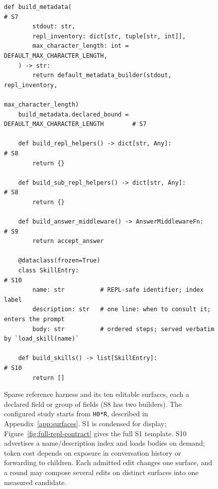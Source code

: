 \begin{figure}[t]
\begin{lstlisting}[style=harness, gobble=4]
    def build_metadata(                                                  # S7
        stdout: str,
        repl_inventory: dict[str, tuple[str, int]],
        max_character_length: int = DEFAULT_MAX_CHARACTER_LENGTH,
    ) -> str:
        return default_metadata_builder(stdout, repl_inventory,
                                        max_character_length)
    build_metadata.declared_bound = DEFAULT_MAX_CHARACTER_LENGTH        # S7
    
    def build_repl_helpers() -> dict[str, Any]:                          # S8
        return {}
    
    def build_sub_repl_helpers() -> dict[str, Any]:                      # S8
        return {}
    
    def build_answer_middleware() -> AnswerMiddlewareFn:                 # S9
        return accept_answer
    
    @dataclass(frozen=True)
    class SkillEntry:                                                    # S10
        name: str          # REPL-safe identifier; index label
        description: str   # one line: when to consult it; enters the prompt
        body: str          # ordered steps; served verbatim by `load_skill(name)`
    
    def build_skills() -> list[SkillEntry]:                              # S10
        return []
    \end{lstlisting}
    \caption{Sparse reference harness \hzero{} and its ten editable surfaces,
    each a declared field or group of fields (S8 has two builders). The configured
    study starts from \texttt{H0*R}, described in Appendix~\ref{app:surfaces}.
    S1 is condensed for display; Figure~\ref{fig:full-repl-contract} gives the
    full \hzero{} S1 template. S10 advertises a name/description index and loads
    bodies on demand; token cost depends on exposure in conversation history or
    forwarding to children. Each admitted edit changes one surface, and a round
    may compose several edits on distinct surfaces into one measured candidate.}
    \label{fig:edit-surfaces}
\end{figure}

